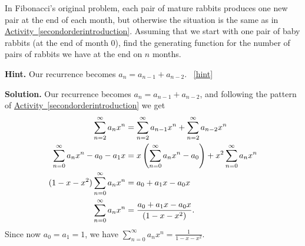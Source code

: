 \documentclass{book}
\begin{document}
\setcounter{project}{261}
\addtocounter{project}{-1}
\begin{activity}[]\label{originalFibonacci}
\hypertarget{p-1375}{}%
In Fibonacci's original problem, each pair of mature rabbits produces one new pair at the end of each month, but otherwise the situation is the same as in \hyperref[secondorderintroduction]{Activity~\ref{secondorderintroduction}}.  Assuming that we start with one pair of baby rabbits (at the end of month 0), find the generating function for the number of pairs of rabbits we have at the end on \(n\) months.%
\par\smallskip%
\noindent\textbf{Hint.}\hypertarget{hint-168}{}\quad%
\hypertarget{p-1376}{}%
Our recurrence becomes \(a_n = a_{n-1} + a_{n-2}\).%
~\hfill{\tiny\hyperlink{a-261}{[hint]}\hypertarget{q-261}{}}\par\smallskip%
\noindent\textbf{Solution.}\hypertarget{solution-173}{}\quad%
\hypertarget{p-1377}{}%
Our recurrence becomes \(a_n=a_{n-1}+a_{n-2}\), and following the pattern of \hyperref[secondorderintroduction]{Activity~\ref{secondorderintroduction}} we get%
\begin{align*}
\sum_{n=2}^\infty a_nx^n &= \sum_{n=2}^\infty a_{n-1}x^n +
\sum_{n=2}^\infty a_{n-2}x^n\\
\sum_{n=0}^\infty a_nx^n-a_0-a_1x  &= x\left(\sum_{n=0}^\infty
a_{n}x^{n}-a_0\right) + x^2\sum_{n=0}^\infty a_{n}x^n\\
(1-x-x^2)\sum_{n=0}^\infty a_nx^n &= a_0+a_1x-a_0x\\
\sum_{n=0}^\infty a_nx^n &= \frac{a_0+a_1x-a_0x}{(1-x-x^2)}\text{.}
\end{align*}
Since now \(a_0=a_1=1\), we have \(\displaystyle \sum_{n=0}^\infty a_nx^n=
\frac{1}{1-x-x^2}\).%
\end{activity}
\end{document}
